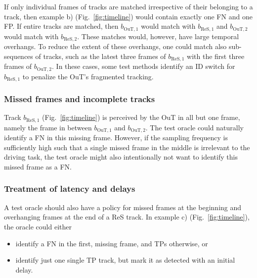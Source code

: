 \documentclass[conference]{IEEEtran}
\begin{document}
If only individual frames of tracks are matched irrespective of their belonging to a track, then example b) (Fig.~\ref{fig:timeline}) would contain exactly one FN and one FP. 
If entire tracks are matched, then $b_{\text{OuT},1}$ would match with $b_{\text{ReS},1}$ and $b_{\text{OuT},2}$ would match with $b_{\text{ReS},2}$.
These matches would, however, have large temporal overhangs.
To reduce the extent of these overhangs, one could match also sub-sequences of tracks, such as the latest three frames of $b_{\text{ReS},1}$ with the first three frames of $b_{\text{OuT},2}$.
In these cases, some test methods identify an ID switch for $b_{\text{ReS},1}$ to penalize the OuT's fragmented tracking.

\subsubsection{Missed frames and incomplete tracks}
\label{sec:temp_incomplete}

Track $b_{\text{ReS},1}$ (Fig.~\ref{fig:timeline}) is perceived by the OuT in all but one frame, namely the frame in between $b_{\text{OuT},1}$ and $b_{\text{OuT},2}$. 
The test oracle could naturally identify a FN in this missing frame. 
However, if the sampling frequency is sufficiently high such that a single missed frame in the middle is irrelevant to the driving task, the test oracle might also intentionally not want to identify this missed frame as a FN. 



\subsubsection{Treatment of latency and delays}
\label{sec:temp_latency}

A test oracle should also have a policy for missed frames at the beginning and overhanging frames at the end of a ReS track. 
In example c) (Fig.~\ref{fig:timeline}), the oracle could either
\begin{itemize}
	\item identify a FN in the first, missing frame, and TPs otherwise, or
	\item identify just one single TP track, but mark it as detected with an initial delay.
\end{itemize}
\end{document}

